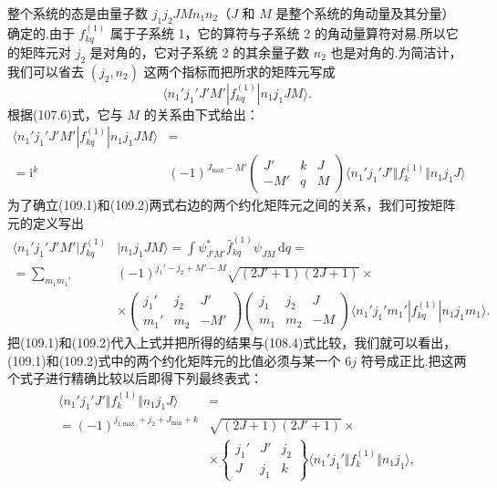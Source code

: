 整个系统的态是由量子数 $j_1j_2JMn_1n_2$（$J$ 和 $M$ 是整个系统的角动量及其分量）确定的.由于 $f^{(1)}_{kq}$ 属于子系统 1，它的算符与子系统 2 的角动量算符对易.所以它的矩阵元对 $j_2$ 是对角的，它对子系统 2 的其余量子数 $n_2$ 也是对角的.为简洁计，我们可以省去 $(j_2,n_2)$ 这两个指标而把所求的矩阵元写成
\begin{equation*}
  \langle n_1'j_1'J'M'|f^{(1)}_{kq}|n_1j_1JM\rangle.
\end{equation*}
根据(107.6)式，它与 $M$ 的关系由下式给出：
\begin{equation}
\begin{aligned}
  \langle n_1'j_1'J'M'|f^{(1)}_{kq}|n_1j_1JM\rangle&=\\
  =\mathrm{i}^k&(-1)^{J_{\max}-M'}
  \left(\begin{array}{ccc}J'&k&J\\-M'&q&M\end{array}\right)
  \langle n_1'j_1'J'\Vert f^{(1)}_k\Vert n_1j_1J\rangle
\end{aligned}
\end{equation}
为了确立(109.1)和(109.2)两式右边的两个约化矩阵元之间的关系，我们可按矩阵元的定义写出
\begin{equation*}
\begin{aligned}
  \langle n_1'j_1'J'M'|f^{(1)}_{kq}&|n_1j_1JM\rangle
  =\int\psi^{*}_{J'M'}\hat{f}^{(1)}_{kq}\psi_{JM}\,\mathrm{d}q=\\
  =\sum_{m_1m_1'}&(-1)^{j_1'-j_2+M'-M}\sqrt{(2J'+1)(2J+1)}\times\\
  &\times\left(\begin{array}{ccc}j_1'&j_2&J'\\m_1'&m_2&-M'\end{array}\right)
  \left(\begin{array}{ccc}j_1&j_2&J\\m_1&m_2&-M\end{array}\right)
  \langle n_1'j_1'm_1'|f^{(1)}_{kq}|n_1j_1m_1\rangle.
\end{aligned}
\end{equation*}
把(109.1)和(109.2)代入上式并把所得的结果与(108.4)式比较，我们就可以看出，(109.1)和(109.2)式中的两个约化矩阵元的比值必须与某一个 $6j$ 符号成正比.把这两个式子进行精确比较以后即得下列最终表式：
\begin{equation}
\begin{aligned}
  \langle n_1'j_1'J'\Vert f^{(1)}_k\Vert n_1j_1J\rangle&=\\
  =(-1)^{j_{1\max}+j_2+J_{\min}+k}&\sqrt{(2J+1)(2J'+1)}\times\\
  &\times\left\{\begin{array}{ccc}j_1'&J'&j_2\\J&j_1&k\end{array}\right\}
  \langle n_1'j_1'\Vert f^{(1)}_k\Vert n_1j_1\rangle,
\end{aligned}
\end{equation}
